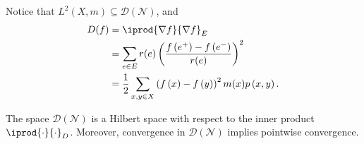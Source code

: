 \documentclass[10pt]{mypackage}
\begin{document}
Notice that $L^2\left( X,m \right)\subseteq \mathcal{D}\left( \mathcal{N} \right)$, and
\begin{align*}
  D(f) &= \iprod{\nabla f}{\nabla f}_E\\
       &= \sum_{e\in E} r(e)\left( \frac{f\left( e^+ \right)-f\left( e^{-} \right)}{r(e)} \right)^2\\
       &= \frac{1}{2}\sum_{x,y\in X} \left( f\left( x \right)-f\left( y \right) \right)^2 m(x)p\left( x,y \right).
\end{align*}
\begin{lemma}
  The space $\mathcal{D}\left( \mathcal{N} \right)$ is a Hilbert space with respect to the inner product $ \iprod{\cdot}{\cdot}_D $. Moreover, convergence in $\mathcal{D}\left( \mathcal{N} \right)$ implies pointwise convergence.
\end{lemma}
\end{document}

